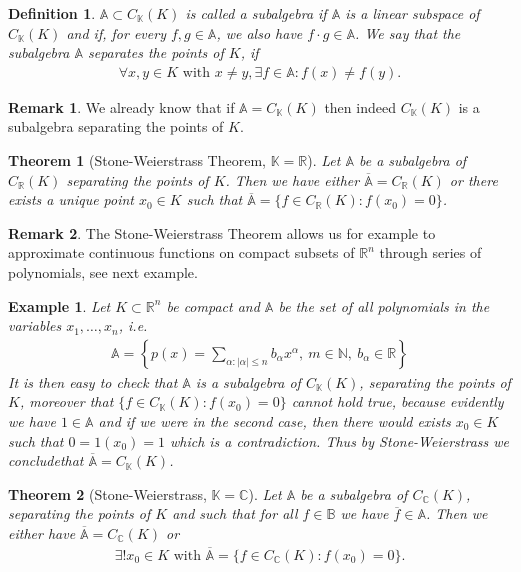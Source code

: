 \documentclass[11pt,a4paper]{article}
\newtheorem{thm}{Theorem}[section]
\newtheorem{defn}{Definition}[section]
\newtheorem{exmp}{Example}[section]
\theoremstyle{definition}
\newtheorem{rem}{Remark}[section]
\begin{document}
\newpage
\begin{defn} $\mathbb{A} \subset C_\mathbb{K}(K)$ is called a subalgebra if $\mathbb{A}$ is a linear subspace of $C_\mathbb{K}(K)$ and if, for every $f,g \in \mathbb{A}$, we also have $f \cdot g \in \mathbb{A}$. We say that the subalgebra $\mathbb{A}$ separates the points of $K$, if 
\begin{align*}
\forall x,y \in K \text{ with } x \neq y, \exists f \in \mathbb{A} : f(x) \neq f(y). 
\end{align*}
\end{defn}
\begin{rem} We already know that if $\mathbb{A}= C_\mathbb{K}(K)$ then indeed $C_\mathbb{K}(K)$ is a subalgebra separating the points of $K$. 
\end{rem}
\begin{thm}[Stone-Weierstrass Theorem, $\mathbb{K}= \mathbb{R}$] Let $\mathbb{A}$ be a subalgebra of $C_\mathbb{R}(K)$ separating the points of $K$. Then we have either $\overline{\mathbb{A}}= C_\mathbb{R}(K)$ or there exists a unique point $x_0 \in K$ such that $\overline{\mathbb{A}}= \lbrace f \in C_\mathbb{R}(K) : f(x_0)=0 \rbrace$. 
\end{thm}
\begin{rem} The Stone-Weierstrass Theorem allows us for example to approximate continuous functions on compact subsets of $\mathbb{R}^n$ through series of polynomials, see next example.
\end{rem}
\begin{exmp} Let $K \subset \mathbb{R}^n$ be compact and $\mathbb{A}$ be the set of all polynomials in the variables $x_1, \dots , x_n$, i.e. 
\begin{align*}
\mathbb{A}= \left\{ p(x) = \sum_{ \alpha : | \alpha| \leq n } b_\alpha x^\alpha, \ m \in \mathbb{N}, \ b_\alpha \in \mathbb{R} \right\} 
\end{align*}
It is then easy to check that $\mathbb{A}$ is a subalgebra of $C_\mathbb{K}(K)$, separating the points of $K$, moreover that $\lbrace f \in C_\mathbb{K}(K) : f(x_0)=0 \rbrace$ cannot hold true, because evidently we have $1 \in \mathbb{A}$ and if we were in the second case, then there would exists $x_0 \in K$ such that $0=1(x_0)=1$ which is a contradiction. Thus by Stone-Weierstrass we concludethat $\overline{\mathbb{A}} = C_\mathbb{K}(K)$. 
\end{exmp}
\begin{thm}[Stone-Weierstrass, $\mathbb{K}= \mathbb{C}$] Let $\mathbb{A}$ be a subalgebra of $C_\mathbb{C}(K)$, separating the points of $K$ and such that for all $f \in \mathbb{B}$ we have $\overline{f} \in \mathbb{A}$. Then we either have $\overline{\mathbb{A}}= C_\mathbb{C}(K)$ or 
\begin{align*}
\exists ! x_0 \in K \text{ with } \overline{\mathbb{A}}= \lbrace f \in C_\mathbb{C}(K) : f(x_0)=0 \rbrace. 
\end{align*}
\end{thm}
\end{document}
